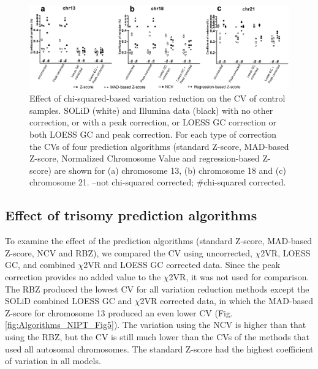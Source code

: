 \begin{figure}
	\includegraphics[width=1.0\linewidth]{img/Algorithms_NIPT_Fig4}
	\caption[Effect of chi-squared-based variation reduction control samples CV.]{Effect of chi-squared-based variation reduction on the CV of control samples. SOLiD (white) and Illumina data (black) with no other correction, or with a peak correction, or LOESS GC correction or both LOESS GC and peak correction. For each type of correction the CVs of four prediction algorithms (standard Z-score, MAD-based Z-score, Normalized Chromosome Value and regression-based Z-score) are shown for (a) chromosome 13, (b) chromosome 18 and (c) chromosome 21. –not chi-squared corrected; \#chi-squared corrected.}
	\label{fig:Algorithms_NIPT_Fig4}
\end{figure}

\subsection{Effect of trisomy prediction algorithms}
To examine the effect of the prediction algorithms (standard Z-score, MAD-based Z-score, NCV and RBZ), we compared the CV using uncorrected, $\chi$2VR, LOESS GC, and combined $\chi$2VR and LOESS GC corrected data. 
Since the peak correction provides no added value to the $\chi$2VR, it was not used for comparison. 
The RBZ produced the lowest CV for all variation reduction methods except the SOLiD combined LOESS GC and $\chi$2VR corrected data, in which the MAD-based Z-score for chromosome 13 produced an even lower CV (Fig. \ref{fig:Algorithms_NIPT_Fig5}). 
The variation using the NCV is higher than that using the RBZ, but the CV is still much lower than the CVs of the methods that used all autosomal chromosomes. 
The standard Z-score had the highest coefficient of variation in all models.

